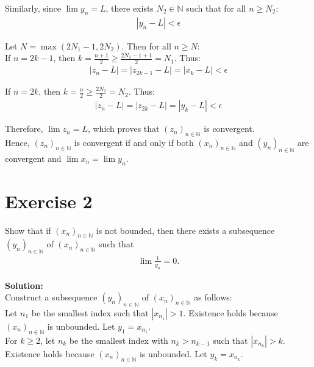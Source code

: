 \documentclass{article}
\begin{document}
Similarly, since $\lim y_n = L$, there exists $N_2 \in \mathbb{N}$ such that for all $n \geq N_2$:
\begin{align*}
|y_n - L| < \epsilon
\end{align*}

Let $N = \max(2N_1 - 1, 2N_2)$. Then for all $n \geq N$: \\

If $n = 2k-1$, then $k = \frac{n+1}{2} \geq \frac{2N_1-1+1}{2} = N_1$. Thus:
\begin{align*}
|z_n - L| = |z_{2k-1} - L| = |x_k - L| < \epsilon
\end{align*}

If $n = 2k$, then $k = \frac{n}{2} \geq \frac{2N_2}{2} = N_2$. Thus:
\begin{align*}
|z_n - L| = |z_{2k} - L| = |y_k - L| < \epsilon
\end{align*}

Therefore, $\lim z_n = L$, which proves that $(z_n)_{n \in \mathbb{N}}$ is convergent. \\

Hence, $(z_n)_{n \in \mathbb{N}}$ is convergent if and only if both $(x_n)_{n \in \mathbb{N}}$ and $(y_n)_{n \in \mathbb{N}}$ are convergent and $\lim x_n = \lim y_n$.

\newpage

\section*{Exercise 2}
Show that if $(x_n)_{n \in \mathbb{N}}$ is not bounded, then there exists a subsequence $(y_n)_{n \in \mathbb{N}}$ of $(x_n)_{n \in \mathbb{N}}$ such that
\begin{align*}
\lim \frac{1}{y_n} = 0.
\end{align*}

\textbf{Solution: }\\

Construct a subsequence $(y_n)_{n \in \mathbb{N}}$ of $(x_n)_{n \in \mathbb{N}}$ as follows: \\

Let $n_1$ be the smallest index such that $|x_{n_1}| > 1$. Existence holds because $(x_n)_{n \in \mathbb{N}}$ is unbounded. Let $y_1 = x_{n_1}$. \\

For $k \geq 2$, let $n_k$ be the smallest index with $n_k > n_{k-1}$ such that $|x_{n_k}| > k$. Existence holds because $(x_n)_{n \in \mathbb{N}}$ is unbounded. Let $y_k = x_{n_k}$. \\
\end{document}
